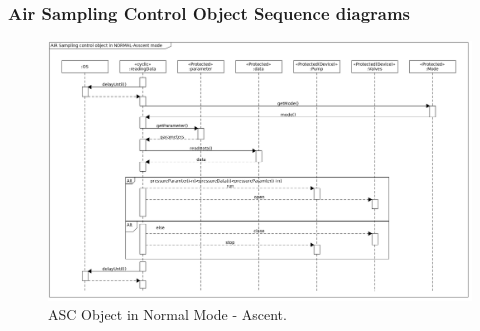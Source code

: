 \documentclass[a4paper,12pt,twoside]{article}
\begin{document}
\begin{appendices}
\begin{landscape}
\subsubsection{Air Sampling Control Object Sequence diagrams}
\begin{figure}[H]
    \centering
    \includegraphics[height=0.75\textwidth]{appendix/img/ASC-seq-dia-v1-2-a.png}
    \caption{ASC Object in Normal Mode - Ascent.}
    \label{ASCa}
\end{figure}


\end{landscape}
\end{appendices}
\end{document}

